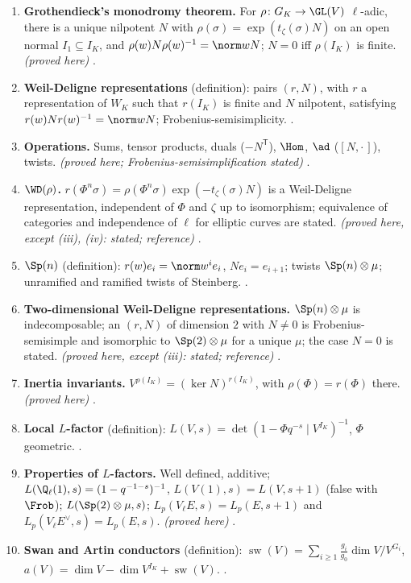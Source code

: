 \begin{enumerate}[label=\textbf{\thechapter.\arabic*}]
.
\item \textbf{Grothendieck's monodromy theorem.} For $\rho\colon G_K\to\GL(V)$ $\ell$-adic, there is a unique nilpotent $N$ with $\rho(\sigma)=\exp(t_\zeta(\sigma)N)$ on an open normal $I_1\subseteq I_K$,
and $\rho(w)N\rho(w)^{-1}=\norm wN$; $N=0$ iff $\rho(I_K)$ is finite. \emph{(proved here)} .
\item \textbf{Weil-Deligne representations} (definition): pairs $(r,N)$, with $r$ a representation of $W_K$ such that $r(I_K)$ is finite and $N$ nilpotent,
satisfying $r(w)Nr(w)^{-1}=\norm wN$; Frobenius-semisimplicity. .
\item \textbf{Operations.} Sums, tensor products, duals ($-N^{\mathsf T}$), $\Hom$, $\ad$ ($[N,\cdot\,]$), twists. \emph{(proved here; Frobenius-semisimplification stated)}
.
\item \textbf{$\WD(\rho)$.} $r(\Phi^n\sigma)=\rho(\Phi^n\sigma)\exp(-t_\zeta(\sigma)N)$ is a Weil-Deligne representation, independent of $\Phi$ and $\zeta$ up to isomorphism; equivalence of
categories and independence of $\ell$ for elliptic curves are stated. \emph{(proved here, except (iii), (iv): stated; reference)} .
\item \textbf{$\Sp(n)$} (definition): $r(w)e_i=\norm w^ie_i$, $Ne_i=e_{i+1}$; twists $\Sp(n)\otimes\mu$; unramified and ramified twists of Steinberg. .
\item \textbf{Two-dimensional Weil-Deligne representations.} $\Sp(n)\otimes\mu$ is indecomposable; an $(r,N)$ of dimension $2$ with $N\ne0$ is Frobenius-semisimple and
isomorphic to $\Sp(2)\otimes\mu$ for a unique $\mu$; the case $N=0$ is stated. \emph{(proved here, except (iii): stated; reference)} .
\item \textbf{Inertia invariants.} $V^{\rho(I_K)}=(\ker N)^{r(I_K)}$, with $\rho(\Phi)=r(\Phi)$ there. \emph{(proved here)} .
\item \textbf{Local $L$-factor} (definition): $L(V,s)=\det(1-\Phi q^{-s}\mid V^{I_K})^{-1}$, $\Phi$ geometric. .
\item \textbf{Properties of $L$-factors.} Well defined, additive; $L(\Q_\ell(1),s)=(1-q^{-1-s})^{-1}$, $L(V(1),s)=L(V,s+1)$ (false with $\Frob$); $L(\Sp(2)\otimes\mu,s)$;
$L_p(V_\ell E,s)=L_p(E,s+1)$ and $L_p(V_\ell E^\vee,s)=L_p(E,s)$. \emph{(proved here)} .
\item \textbf{Swan and Artin conductors} (definition): $\operatorname{sw}(V)=\sum_{i\ge1}\frac{g_i}{g_0}\dim V/V^{G_i}$, $a(V)=\dim V-\dim V^{I_K}+\operatorname{sw}(V)$. .

\end{enumerate}
